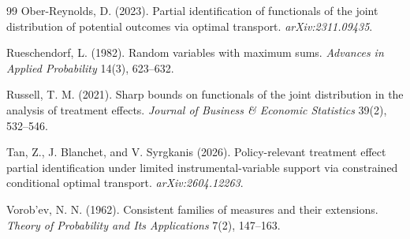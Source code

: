 \documentclass[11pt]{article}
\theoremstyle{definition}
\theoremstyle{plain}
\theoremstyle{remark}
\begin{document}
\begin{thebibliography}{99}
Ober-Reynolds, D. (2023).
Partial identification of functionals of the joint distribution of potential
outcomes via optimal transport.
\emph{arXiv:2311.09435}.

Rueschendorf, L. (1982).
Random variables with maximum sums.
\emph{Advances in Applied Probability} 14(3), 623--632.

Russell, T. M. (2021).
Sharp bounds on functionals of the joint distribution in the analysis of
treatment effects.
\emph{Journal of Business \& Economic Statistics} 39(2), 532--546.

Tan, Z., J. Blanchet, and V. Syrgkanis (2026).
Policy-relevant treatment effect partial identification under limited
instrumental-variable support via constrained conditional optimal transport.
\emph{arXiv:2604.12263}.

Vorob'ev, N. N. (1962).
Consistent families of measures and their extensions.
\emph{Theory of Probability and Its Applications} 7(2), 147--163.
\end{thebibliography}
\end{document}
